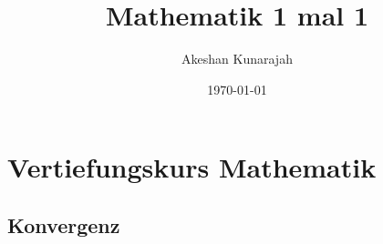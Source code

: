 \documentclass{article}
\title{Mathematik 1 mal 1}
\author{Akeshan Kunarajah}
\date{\today}
\begin{document}
\maketitle
\tableofcontents

\section{Vertiefungskurs Mathematik}
\subsection{Konvergenz}
\end{document}
